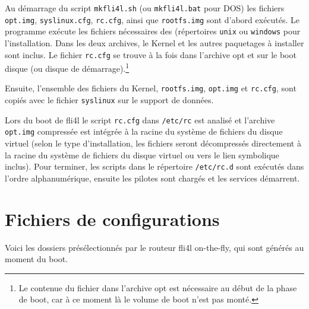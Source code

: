 Au démarrage du script \texttt{mkfli4l.sh} (ou \texttt{mkfli4l.bat} pour DOS) les fichiers
\texttt{opt.img}, \texttt{syslinux.cfg}, \texttt{rc.cfg}, ainsi que \texttt{rootfs.img}
sont d'abord exécutés. Le programme  exécute les fichiers nécessaires des
(répertoires \texttt{unix} ou \texttt{windows} pour l'installation. Dans les deux archives,
le Kernel et les autres paquetages à installer sont inclus. Le fichier \texttt{rc.cfg} se trouve
à la fois dans l'archive opt et sur le boot disque (ou disque de démarrage).\footnote{Le
contenue du fichier dans l'archive opt est nécessaire au début de la phase de boot, car à ce
moment là le volume de boot n'est pas monté.}

Ensuite, l’ensemble des fichiers du Kernel, \texttt{rootfs.img}, \texttt{opt.img} et \texttt{rc.cfg},
sont copiés avec le fichier \texttt{syslinux} sur le support de données.

Lors du boot de fli4l le script \texttt{rc.cfg} dans \texttt{/etc/rc} est analisé
et l'archive \texttt{opt.img} compressée est intégrée à la racine du système de fichiers
du disque virtuel (selon le type d'installation, les fichiers seront décompressés directement
à la racine du système de fichiers du disque virtuel ou vers le lien symbolique inclus).
Pour terminer, les scripts dans le répertoire \texttt{/etc/rc.d} sont exécutés dans l'ordre
alphanumérique, ensuite les pilotes sont chargés et les services démarrent.

\section{Fichiers de configurations}

Voici les dossiers présélectionnés par le routeur fli4l on-the-fly, qui sont générés
au moment du boot.

